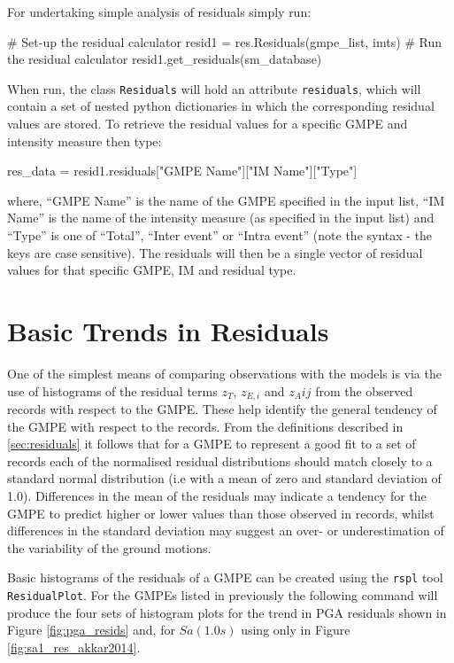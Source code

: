 For undertaking simple analysis of residuals simply run:

\begin{python}[frame=single]
# Set-up the residual calculator
resid1 = res.Residuals(gmpe_list, imts)
# Run the residual calculator
resid1.get_residuals(sm_database)
\end{python}

When run, the class \verb=Residuals= will hold an attribute \verb=residuals=, which will contain a set of nested python dictionaries in which the corresponding residual values are stored. To retrieve the residual values for a specific GMPE and intensity measure then type:

\begin{python}
res_data = resid1.residuals["GMPE Name"]["IM Name"]["Type"]
\end{python}

where, ``GMPE Name'' is the name of the GMPE specified in the input list, ``IM Name'' is the name of the intensity measure (as specified in the input list) and ``Type'' is one of ``Total'', ``Inter event'' or ``Intra event'' (note the syntax - the keys are case sensitive). The residuals will then be a single vector of residual values for that specific GMPE, IM and residual type.
  

\section{Basic Trends in Residuals}
\label{sec:residual_trends}

One of the simplest means of comparing observations with the models is via the use of histograms of the residual terms $z_T$, $z_{E, i}$ and $z_A{ij}$ from the observed records with respect to the GMPE. These help identify the general tendency of the GMPE with respect to the records. From the definitions described in \ref{sec:residuals} it follows that for a GMPE to represent a good fit to a set of records each of the normalised residual distributions should match closely to a standard normal distribution (i.e with a mean of zero and standard deviation of 1.0). Differences in the mean of the residuals may indicate a tendency for the GMPE to predict higher or lower values than those observed in records, whilst differences in the standard deviation may suggest an over- or underestimation of the variability of the ground motions.

Basic histograms of the residuals of a GMPE can be created using the \verb=rspl= tool \verb=ResidualPlot=. For the GMPEs listed in previously the following command will produce the four sets of histogram plots for the trend in PGA residuals shown in Figure \ref{fig:pga_resids} and, for $Sa \left( {1.0 s} \right)$ using \textcite{Akkar_etal2014} only in Figure \ref{fig:sa1_res_akkar2014}.


